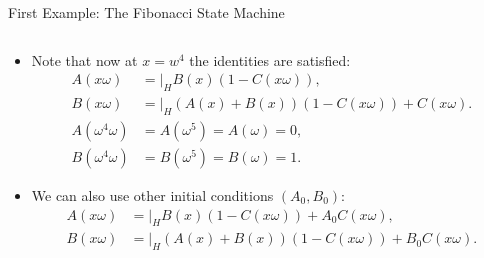 \begin{frame}[allowframebreaks]{First Example: The Fibonacci State Machine}
\begin{columns}
\begin{column}{0.6\textwidth}
\begin{itemize}
\item Note that now at $x = w^4$ the identities are satisfied:
\begin{align*}
A(x\omega) &= \bigg\lvert_H  B(x)(1 - C(x\omega)), \\
B(x\omega) &= \bigg\lvert_H (A(x) + B(x))(1 - C(x\omega)) + C(x\omega).\\
A(\omega^4 \omega) &= A(\omega^5) = A(\omega) = 0, \\
B(\omega^4 \omega) &= B(\omega^5) = B(\omega) = 1.
\end{align*}
\item We can also use other initial conditions $(A_0, B_0)$:
\begin{align*}
A(x\omega) &= \bigg\lvert_H  B(x)(1 - C(x\omega))+ A_0C(x\omega), \\
B(x\omega) &= \bigg\lvert_H  (A(x) + B(x))(1 - C(x\omega)) + B_0 C(x\omega).
\end{align*}
\end{itemize}
\end{column}
\end{columns}
\end{frame}





